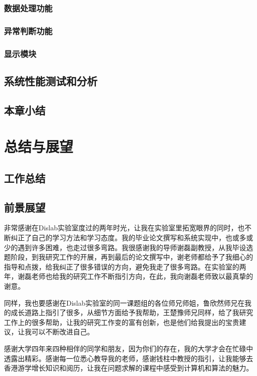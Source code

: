 \documentclass[winfonts]{njuthesis}
\begin{document}
		\subsection{数据处理功能}
		\subsection{异常判断功能}
		\subsection{显示模块}
		
	\section{系统性能测试和分析}
	\section{本章小结}
\chapter{总结与展望}
	\section{工作总结}
	\section{前景展望}

	\begin{acknowledgement}
		
		非常感谢在Dislab实验室度过的两年时光，让我在实验室里拓宽眼界的同时，也不断纠正了自己的学习方法和学习态度。我的毕业论文撰写和系统实现中，也或多或少的遇到许多困难，也走过很多弯路。我很感谢我的导师谢磊副教授，从我毕设选题阶段，到我研究工作的开展，再到最后的论文撰写中，谢老师都给予了我细心的指导和点拨，给我纠正了很多错误的方向，避免我走了很多弯路。在实验室的两年，谢磊老师也给我的研究工作不断指引方向，在此，我向谢磊老师致以最真挚的谢意。
		
		同样，我也要感谢在Dislab实验室的同一课题组的各位师兄师姐，鲁欣然师兄在我的成长道路上指引了很多，从细节方面给予我帮助，王楚豫师兄同样，给了我研究工作上的很多帮助，让我的研究工作变的富有创新，也是他们给我提出的宝贵建议，让我可以不断改进自己。
		
		感谢大学四年来四种相伴的同学和朋友，因为你们的存在，我的大学才会在忙碌中透露出精彩。感谢每一位悉心教导我的老师，感谢钱柱中教授的指引，让我能够去香港游学增长知识和阅历，让我在问题求解的课程中感受到计算机和算法的魅力。
		
	\end{acknowledgement}
\end{document}
